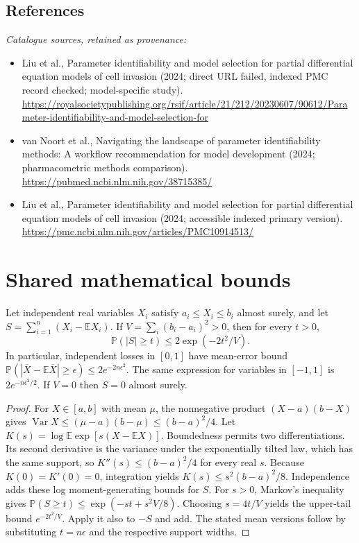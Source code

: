 \documentclass[11pt]{article}
\begin{document}
\subsection{References}
\noindent\emph{Catalogue sources, retained as provenance:}
\begin{itemize}
\item Liu et al., Parameter identifiability and model selection for partial differential equation models of cell invasion (2024; direct URL failed, indexed PMC record checked; model-specific study). \url{https://royalsocietypublishing.org/rsif/article/21/212/20230607/90612/Parameter-identifiability-and-model-selection-for}
\item van Noort et al., Navigating the landscape of parameter identifiability methods: A workflow recommendation for model development (2024; pharmacometric methods comparison). \url{https://pubmed.ncbi.nlm.nih.gov/38715385/}
\item Liu et al., Parameter identifiability and model selection for partial differential equation models of cell invasion (2024; accessible indexed primary version). \url{https://pmc.ncbi.nlm.nih.gov/articles/PMC10914513/}
\end{itemize}




\section{Shared mathematical bounds}\label{app:bounds}
\begin{lemma}\label{lem:bounded}
Let independent real variables $X_i$ satisfy $a_i\leq X_i\leq b_i$ almost surely,
and let $S=\sum_{i=1}^n(X_i-\mathbb{E} X_i)$. If
$V=\sum_i(b_i-a_i)^2>0$, then for every $t>0$,
\[
 \mathbb{P}(|S|\geq t)\leq 2\exp(-2t^2/V).
\]
In particular, independent losses in $[0,1]$ have mean-error bound
$\mathbb{P}(|\overline X-\mathbb{E}\overline X|\geq\epsilon)
\leq2e^{-2n\epsilon^2}$. The same expression for variables in $[-1,1]$
is $2e^{-n\epsilon^2/2}$. If $V=0$ then $S=0$ almost surely.
\end{lemma}
\begin{proof}
For $X\in[a,b]$ with mean $\mu$, the nonnegative product
$(X-a)(b-X)$ gives
$\operatorname{Var} X\leq(\mu-a)(b-\mu)\leq(b-a)^2/4$.
Let $K(s)=\log\mathbb{E}\exp[s(X-\mathbb{E} X)]$.
Boundedness permits two differentiations. Its second derivative is the variance
under the exponentially tilted law, which has the same support, so
$K''(s)\leq(b-a)^2/4$ for every real $s$.
Because $K(0)=K'(0)=0$, integration yields
$K(s)\leq s^2(b-a)^2/8$.
Independence adds these log moment-generating bounds for $S$.
For $s>0$, Markov's inequality gives
$\mathbb{P}(S\geq t)\leq\exp(-st+s^2V/8)$.
Choosing $s=4t/V$ yields the upper-tail bound $e^{-2t^2/V}$.
Apply it also to $-S$ and add. The stated mean versions follow by substituting
$t=n\epsilon$ and the respective support widths.
\end{proof}
\end{document}
